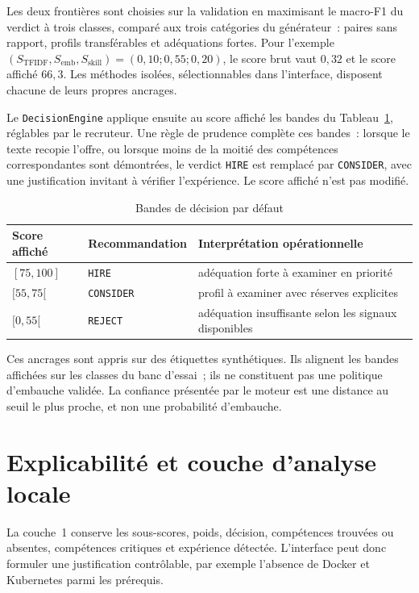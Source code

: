 Les deux frontières sont choisies sur la validation en maximisant le macro-F1 du verdict à trois classes, comparé aux trois catégories du générateur~: paires sans rapport, profils transférables et adéquations fortes. Pour l'exemple $(S_{\mathrm{TFIDF}},S_{\mathrm{emb}},S_{\mathrm{skill}})=(0{,}10;0{,}55;0{,}20)$, le score brut vaut $0{,}32$ et le score affiché $66{,}3$. Les méthodes isolées, sélectionnables dans l'interface, disposent chacune de leurs propres ancrages.

Le \texttt{DecisionEngine} applique ensuite au score affiché les bandes du Tableau~\ref{tab:chap4-seuils}, réglables par le recruteur. Une règle de prudence complète ces bandes~: lorsque le texte recopie l'offre, ou lorsque moins de la moitié des compétences correspondantes sont démontrées, le verdict \texttt{HIRE} est remplacé par \texttt{CONSIDER}, avec une justification invitant à vérifier l'expérience. Le score affiché n'est pas modifié.

\begin{table}[htbp]
  \centering
  \caption{Bandes de décision par défaut}
  \label{tab:chap4-seuils}
  \begin{tabular}{|l|l|l|}
    \hline
    Score affiché & Recommandation & Interprétation opérationnelle \\
    \hline
    $[75,100]$ & \texttt{HIRE} & adéquation forte à examiner en priorité \\
    \hline
    $[55,75[$ & \texttt{CONSIDER} & profil à examiner avec réserves explicites \\
    \hline
    $[0,55[$ & \texttt{REJECT} & adéquation insuffisante selon les signaux disponibles \\
    \hline
  \end{tabular}
\end{table}

Ces ancrages sont appris sur des étiquettes synthétiques. Ils alignent les bandes affichées sur les classes du banc d'essai~; ils ne constituent pas une politique d'embauche validée. La confiance présentée par le moteur est une distance au seuil le plus proche, et non une probabilité d'embauche.

\section{Explicabilité et couche d'analyse locale}

La couche~1 conserve les sous-scores, poids, décision, compétences trouvées ou absentes, compétences critiques et expérience détectée. L'interface peut donc formuler une justification contrôlable, par exemple l'absence de Docker et Kubernetes parmi les prérequis.

